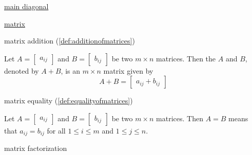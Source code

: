 \documentclass{ximera}
\begin{document}
\href{https://ximera.osu.edu/oerlinalg/LinearAlgebra/MAT-0010/main}{main diagonal}
    
\href{https://ximera.osu.edu/oerlinalg/LinearAlgebra/MAT-0010/main}{matrix}

matrix addition (\ref{def:additionofmatrices})
\begin{expandable}
    Let $A=\begin{bmatrix} a_{ij}\end{bmatrix} $ and $B=\begin{bmatrix} b_{ij}\end{bmatrix}$ be two
$m\times n$ matrices. Then the  $A$ and $B$, denoted by $A+B$,  is an $m \times n$
matrix  given by 
$$A+B=\begin{bmatrix}a_{ij}+b_{ij}\end{bmatrix}$$
\end{expandable}

matrix equality (\ref{def:equalityofmatrices})
\begin{expandable}
    Let $A=\begin{bmatrix} a_{ij}\end{bmatrix}$ and $B=\begin{bmatrix} b_{ij}\end{bmatrix}$ be two $m \times n$ matrices. Then $A=B$ means
that $a_{ij}=b_{ij}$ for all $1\leq i\leq m$ and 
$1\leq j\leq n$.
\end{expandable}

matrix factorization
\end{document}
